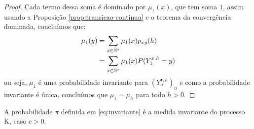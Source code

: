 \begin{proof}
  Cada termo dessa soma é dominado por $\mu_1(x)$, que tem soma $1$,
  assim usando a Proposição \ref{prop:transicao-continua} e o teorema da
  convergência dominada, concluímos que:
  \begin{align*}
    \mu_1 (y) &= \sum_{x \in {\mathbb{\bar{N}^*}}} \mu_1(x) p_{x y} (h)\\
    &= \sum_{x \in {\mathbb{\bar{N}^*}}} \mu_1(x) P(Y_1^{x, h} = y)\\
  \end{align*}
  ou seja, $\mu_1$ é uma probabilidade invariante para $(Y_n^{\bullet,
    h})_n $ e como a probabilidade invariante é única, concluímos que
  $\mu_1 = \mu_h$ para todo $h > 0$.
\end{proof}


\begin{proposicao}
  A probabilidade $\pi$ definida em \eqref{eq:invariante} é a medida
  invariante do processo K, caso $c > 0$.
\end{proposicao}
